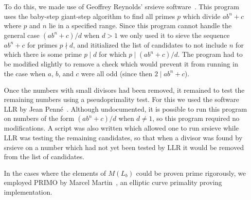 \documentclass[12pt]{article}
\theoremstyle{plain}
\theoremstyle{definition}
\theoremstyle{remark}
\newcommand{\0}{\mathtt{0}}
\newcommand{\1}{\mathtt{1}}
\newcommand{\2}{\mathtt{2}}
\newcommand{\3}{\mathtt{3}}
\newcommand{\4}{\mathtt{4}}
\newcommand{\5}{\mathtt{5}}
\newcommand{\6}{\mathtt{6}}
\newcommand{\7}{\mathtt{7}}
\newcommand{\8}{\mathtt{8}}
\newcommand{\9}{\mathtt{9}}
\begin{document}
To do this, we made use of Geoffrey Reynolds' srsieve software~\cite{srsieve}.  This program uses the baby-step giant-step
algorithm to find all primes $p$ which divide $ab^n+c$ where $p$ and $n$ lie in a specified range.  Since this program cannot
handle the general case $(ab^n+c)/d$ when $d>1$ we only used it to sieve the sequence $ab^n+c$ for primes $p\nmid d$, and ititialized the list of candidates to not include $n$ for which there is some prime $p\mid d$ for which $p\mid(ab^n+c)/d$.
The program had to be modified slightly to remove a check which would prevent it from running in the case when $a$, $b$, and $c$ were all odd (since then $2\mid ab^n+c$).

Once the numbers with small divisors had been removed, it remained to test the remaining numbers using a pseudoprimality test.
For this we used the software LLR by Jean Penn\'e~\cite{llr}.
Although undocumented, it is possible to run this program on numbers of the form $(ab^n+c)/d$ when $d\neq1$, so this program required no modifications.
A script was also written which allowed one to run srsieve while LLR was testing the remaining candidates, so that when a divisor
was found by srsieve on a number which had not yet been tested by LLR it would be removed from the list of candidates.

In the cases where the elements of $M(L_b)$ could be proven prime rigorously,
we employed PRIMO by Marcel Martin~\cite{primo}, an elliptic curve primality proving implementation.
\end{document}
